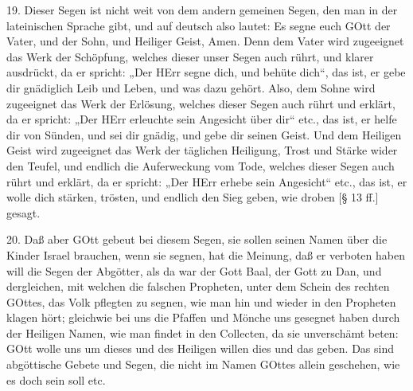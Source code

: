19. Dieser Segen ist nicht weit von dem andern gemeinen Segen, den man in der lateinischen Sprache gibt, und auf deutsch also lautet: Es segne euch GOtt der Vater, und der Sohn, und Heiliger Geist, Amen. Denn dem Vater wird zugeeignet das Werk der Schöpfung, welches dieser unser Segen auch rührt, und klarer ausdrückt, da er spricht: „Der HErr segne dich, und behüte dich“, das ist, er gebe dir gnädiglich Leib und Leben, und was dazu gehört. Also, dem Sohne wird zugeeignet das Werk der Erlösung, welches dieser Segen auch rührt und erklärt, da er spricht: „Der HErr erleuchte sein Angesicht über dir“ etc., das ist, er helfe dir von Sünden, und sei dir gnädig, und gebe dir seinen Geist. Und dem Heiligen Geist wird zugeeignet das Werk der täglichen Heiligung, Trost und Stärke wider den Teufel, und endlich die Auferweckung vom Tode, welches dieser Segen auch rührt und erklärt, da er spricht: „Der HErr erhebe sein Angesicht“ etc., das ist, er wolle dich stärken, trösten, und endlich den Sieg geben, wie droben [§ 13 ff.] gesagt.

20. Daß aber GOtt gebeut bei diesem Segen, sie sollen seinen Namen über die Kinder Israel brauchen, wenn sie segnen, hat die Meinung, daß er verboten haben will die Segen der Abgötter, als da war der Gott Baal, der Gott zu Dan, und dergleichen, mit welchen die falschen Propheten, unter dem Schein des rechten GOttes, das Volk pflegten zu segnen, wie man hin und wieder in den Propheten klagen hört; gleichwie bei uns die Pfaffen und Mönche uns gesegnet haben durch der Heiligen Namen, wie man findet in den Collecten, da sie unverschämt beten: GOtt wolle uns um dieses und des Heiligen willen dies und das geben. Das sind abgöttische Gebete und Segen, die nicht im Namen GOttes allein geschehen, wie es doch sein soll etc.
